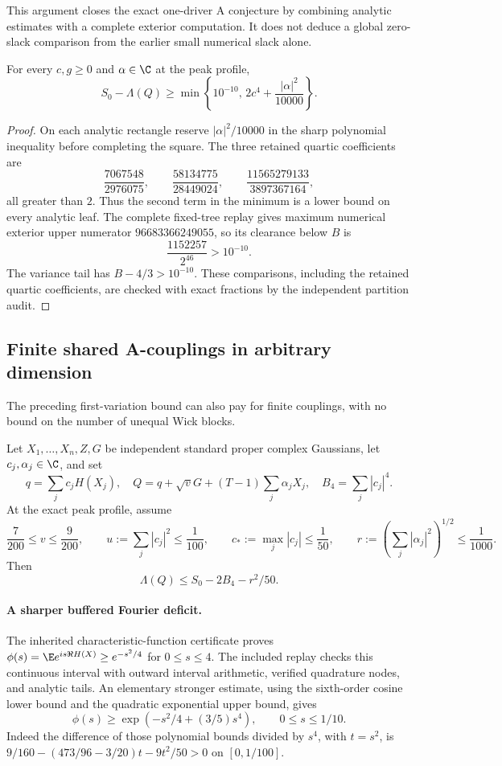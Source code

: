 This argument closes the exact one-driver A conjecture by combining
analytic estimates with a complete exterior computation. It does not
deduce a global zero-slack comparison from the earlier small numerical
slack alone.

\begin{corollary}
For every $c,g\ge0$ and $\alpha\in\C$ at the peak profile,
\[
 S_0-\Lambda(Q)\ge
 \min\left\{10^{-10},\,2c^4+\frac{|\alpha|^2}{10000}\right\}.
\]
\end{corollary}
\begin{proof}
On each analytic rectangle reserve $|\alpha|^2/10000$ in the sharp
polynomial inequality before completing the square. The three retained
quartic coefficients are
\[
 \frac{7067548}{2976075},\qquad
 \frac{58134775}{28449024},\qquad
 \frac{11565279133}{3897367164},
\]
all greater than $2$. Thus the second term in the minimum is a lower
bound on every analytic leaf. The complete fixed-tree replay gives
maximum numerical exterior upper numerator $96683366249055$, so its
clearance below $B$ is
\[
 \frac{1152257}{2^{46}}>10^{-10}.
\]
The variance tail has $B-4/3>10^{-10}$. These comparisons, including
the retained quartic coefficients, are checked with exact fractions
by the independent partition audit.
\end{proof}

\subsection{Finite shared A-couplings in arbitrary dimension}
The preceding first-variation bound can also pay for finite couplings,
with no bound on the number of unequal Wick blocks.
\begin{theorem}
\label{thm:coherent-unequal}
Let $X_1,\ldots,X_n,Z,G$ be independent standard proper complex
Gaussians, let $c_j,\alpha_j\in\C$, and set
\[
 q=\sum_jc_jH(X_j),\quad
 Q=q+\sqrt vG+(T-1)\sum_j\alpha_jX_j,\quad
 B_4=\sum_j|c_j|^4.
\]
At the exact peak profile, assume
\[
 \frac7{200}\le v\le\frac9{200},\qquad
 u:=\sum_j|c_j|^2\le\frac1{100},\qquad
 c_*:=\max_j|c_j|\le\frac1{50},\qquad
 r:=\left(\sum_j|\alpha_j|^2\right)^{1/2}\le\frac1{1000}.
\]
Then
\[
 \boxed{\Lambda(Q)\le S_0-2B_4-r^2/50.}
\]
\end{theorem}

\paragraph{A sharper buffered Fourier deficit.}
The inherited characteristic-function certificate proves
$\phi(s)=\E e^{is\Re H(X)}\ge e^{-s^2/4}$ for $0\le s\le4$.
The included replay checks this continuous interval with outward
interval arithmetic, verified quadrature nodes, and analytic tails.
An elementary stronger estimate, using the sixth-order cosine lower
bound and the quadratic exponential upper bound, gives
\[
 \phi(s)\ge\exp(-s^2/4+(3/5)s^4),\qquad 0\le s\le1/10.
\]
Indeed the difference of those polynomial bounds divided by $s^4$,
with $t=s^2$, is
$9/160-(473/96-3/20)t-9t^2/50>0$ on $[0,1/100]$.

